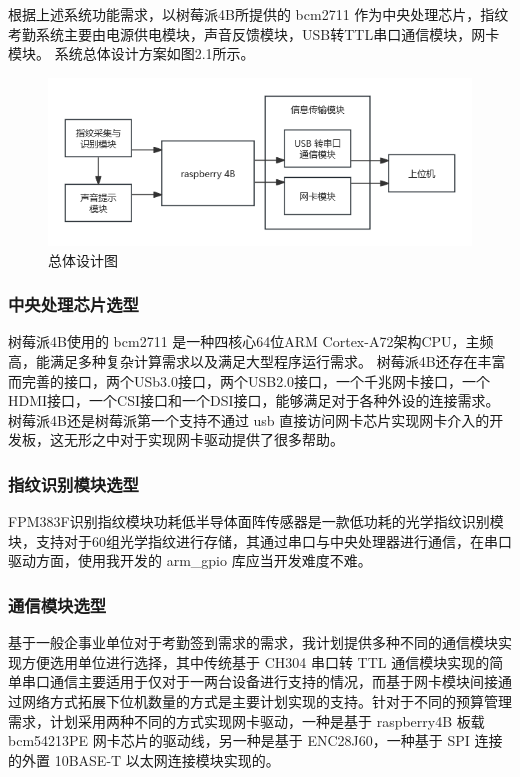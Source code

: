 \documentclass[UTF8,AutoFakeBold=1,AutoFakeSlant,zihao=-4]{cucugthesis}
\begin{document}
根据上述系统功能需求，以树莓派4B所提供的 bcm2711 作为中央处理芯片，指纹考勤系统主要由电源供电模块，声音反馈模块，USB转TTL串口通信模块，网卡模块。
系统总体设计方案如图2.1所示。

\begin{figure}[ht]
    \centering
    \includegraphics[width=\textwidth]{imgs/总体设计图.png}
    \caption{总体设计图}    \label{overall_design}
\end{figure}

\subsubsection{中央处理芯片选型}

树莓派4B使用的 bcm2711 是一种四核心64位ARM Cortex-A72架构CPU，主频高，能满足多种复杂计算需求以及满足大型程序运行需求。
树莓派4B还存在丰富而完善的接口，两个USb3.0接口，两个USB2.0接口，一个千兆网卡接口，一个HDMI接口，一个CSI接口和一个DSI接口，能够满足对于各种外设的连接需求。
树莓派4B还是树莓派第一个支持不通过 usb 直接访问网卡芯片实现网卡介入的开发板，这无形之中对于实现网卡驱动提供了很多帮助。

\subsubsection{指纹识别模块选型}
FPM383F识别指纹模块功耗低半导体面阵传感器是一款低功耗的光学指纹识别模块，支持对于60组光学指纹进行存储，其通过串口与中央处理器进行通信，在串口驱动方面，使用我开发的 arm\_gpio 库应当开发难度不难。

\subsubsection{通信模块选型}

基于一般企事业单位对于考勤签到需求的需求，我计划提供多种不同的通信模块实现方便选用单位进行选择，其中传统基于 CH304 串口转 TTL 通信模块实现的简单串口通信主要适用于仅对于一两台设备进行支持的情况，而基于网卡模块间接通过网络方式拓展下位机数量的方式是主要计划实现的支持。针对于不同的预算管理需求，计划采用两种不同的方式实现网卡驱动，一种是基于 raspberry4B 板载 bcm54213PE 网卡芯片的驱动线，另一种是基于 ENC28J60，一种基于 SPI 连接的外置 10BASE-T 以太网连接模块实现的。
\end{document}
